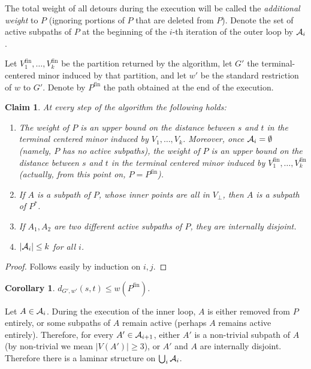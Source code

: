 \documentclass[twoside,leqno,twocolumn]{article}
\newtheorem{claim}[lemma]{Claim}
\newtheorem{corollary}[theorem]{Corollary}
\newtheorem{claim}[theorem]{Claim}
\newcommand{\fin}{{\text{fin}}}
\begin{document}
The total weight of all detours during the execution will be called the {\em additional weight} to $P$ (ignoring portions of $P$ that are deleted from $P$).
Denote the set of active subpaths of $P$ at the beginning of the $i$-th iteration of the outer loop by ${\cal A}_i$.

Let $V_1^\fin,\ldots,V_k^\fin$ be the partition returned by the algorithm, let $G'$ the terminal-centered minor induced by that partition, and let $w'$ be the standard restriction of $w$ to $G'$. 
Denote by $P^\fin$ the path obtained at the end of the execution.
\begin{claim} 
At every step of the algorithm the following holds:
\begin{enumerate}
	\item The weight of $P$ is an upper bound on the distance between $s$ and $t$ in the terminal centered minor induced by $V_1,\ldots, V_k$. Moreover, once ${\cal A}_i = \emptyset$ (namely, $P$ has no active subpaths), the weight of $P$ is an upper bound on the distance between $s$ and $t$ in the terminal centered minor induced by $V_1^\fin,\ldots, V_k^\fin$ (actually, from this point on, $P=P^\fin$).
	\item If $A$ is a subpath of $P$, whose inner points are all in $V_\bot$, then $A$ is a subpath of $P^*$.
	\item If $A_1,A_2$ are two different active subpaths of $P$, they are internally disjoint.
	\item $|{\cal A}_i| \le k$ for all $i$.
\end{enumerate}
\end{claim}

\begin{proof}
Follows easily by induction on $i,j$.
\end{proof} 
\begin{corollary} \label{cor:costMinor}
$d_{G',w'}(s,t) \le w(P^\fin)$.
\end{corollary}

Let $A \in {\cal A}_i$. During the execution of the inner loop, $A$ is either removed from $P$ entirely, or some subpaths of $A$ remain active (perhaps $A$ remains active entirely). Therefore, for every $A' \in {\cal A}_{i+1}$, either $A'$ is a non-trivial subpath of $A$ (by non-trivial we mean $|V(A')| \ge 3$), or $A'$ and $A$ are internally disjoint. Therefore there is a laminar structure on $\bigcup_i{\cal A}_i$. 
\end{document}
